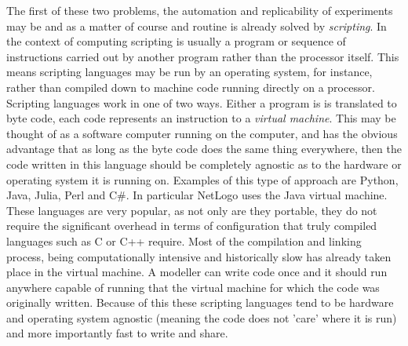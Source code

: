 \documentclass[runningheads]{llncs}
\begin{document}

The first of these two problems, the automation and replicability of
experiments  may be and as a matter of course and routine is already solved by
\emph{scripting}.  In the context of computing scripting is usually a program
or sequence of instructions carried out by another program rather than the
processor itself. This means scripting languages may be run by an
operating system, for instance, rather than compiled down to machine code
running directly on a processor.  Scripting languages work in one of two ways.
Either a program is is translated to  byte code, each code represents an
instruction to a \emph{virtual machine}.  This may be thought of as a software
computer running on the computer, and has the  obvious advantage that as long
as the byte code does the same thing everywhere, then the code written in this
language should be completely agnostic as to the hardware or operating system
it is running on.  Examples of this type of approach are Python, Java, Julia,
Perl and  C\#. In particular NetLogo uses the Java virtual machine. These
languages are very popular, as not only are they portable, they do not require
the significant overhead in terms of configuration that truly compiled
languages such as C or C++ require.  Most of the compilation and linking
process, being computationally intensive and historically slow  has already
taken place in the virtual machine. A modeller can write code once and it
should run anywhere capable of running that the virtual machine for which the
code was originally written. Because of this these scripting languages tend to
be hardware and operating system agnostic (meaning the code does not 'care'
where it is run) and more importantly fast to write and share.
\end{document}
